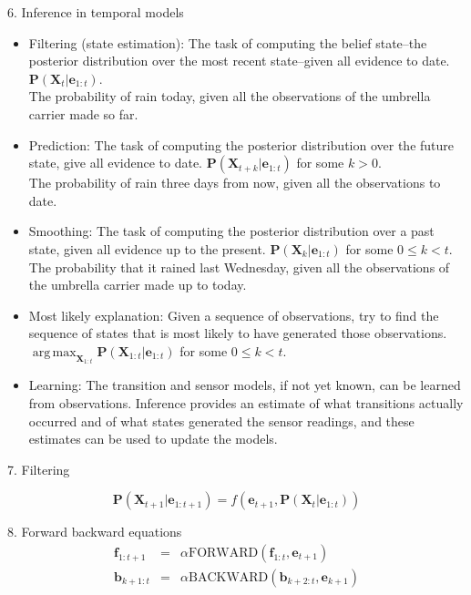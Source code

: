 \documentclass[12pt]{article}
\DeclareMathOperator*{\argmax}{arg\,max}
\begin{document}
6. Inference in temporal models
\begin{itemize}
\item Filtering (state estimation): The task of computing the belief state--the posterior distribution over the most recent state--given all evidence to date. $\boldsymbol{P}(\boldsymbol{X}_t | \boldsymbol{e}_{1:t})$. \\
The probability of rain today, given all the observations of the umbrella carrier made so far.
\item Prediction: The task of computing the posterior distribution over the future state, give all evidence to date. $\boldsymbol{P}(\boldsymbol{X}_{t+k} | \boldsymbol{e}_{1:t})$ for some $k>0$. \\
The probability of rain three days from now, given all the observations to date.
\item Smoothing: The task of computing the posterior distribution over a past state, given all evidence up to the present. $\boldsymbol{P}(\boldsymbol{X}_k | \boldsymbol{e}_{1:t})$ for some $0 \le k < t$. \\
The probability that it rained last Wednesday, given all the observations of the umbrella carrier made up to today.
\item Most likely explanation: Given a sequence of observations, try to find the sequence of states that is most likely to have generated those observations. \\
$\argmax_{\boldsymbol{X}_{1:t}}\boldsymbol{P}(\boldsymbol{X}_{1:t} | \boldsymbol{e}_{1:t})$ for some $0 \le k < t$.
\item Learning: The transition and sensor models, if not yet known, can be learned from observations. Inference provides an estimate of what transitions actually occurred and of what states generated the sensor readings, and these estimates can be used to update the models.
\end{itemize}

7. Filtering

\begin{equation*}
\boldsymbol{P}(\boldsymbol{X}_{t+1} | \boldsymbol{e}_{1:t+1})
= f(\boldsymbol{e}_{t+1}, 
    \boldsymbol{P}(\boldsymbol{X}_t | \boldsymbol{e}_{1:t}))
\end{equation*}

8. Forward backward equations
\begin{eqnarray*}
\boldsymbol{f}_{1:t+1}
&=& \alpha \text{FORWARD}(\boldsymbol{f}_{1:t}, \boldsymbol{e}_{t+1}) \\
\boldsymbol{b}_{k+1:t}
&=& \alpha \text{BACKWARD}(\boldsymbol{b}_{k+2:t}, \boldsymbol{e}_{k+1})
\end{eqnarray*}
\end{document}
